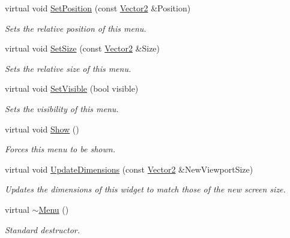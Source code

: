 \begin{DoxyCompactItemize}
virtual void \hyperlink{classphys_1_1UI_1_1Menu_a53ff13bb9b850fb8196c1c0c637afbd5}{SetPosition} (const \hyperlink{classphys_1_1Vector2}{Vector2} \&Position)
\begin{DoxyCompactList}\small\item\em Sets the relative position of this menu. \item\end{DoxyCompactList}\item 
virtual void \hyperlink{classphys_1_1UI_1_1Menu_adef3f9d3351c959f711e929a5e1c8f76}{SetSize} (const \hyperlink{classphys_1_1Vector2}{Vector2} \&Size)
\begin{DoxyCompactList}\small\item\em Sets the relative size of this menu. \item\end{DoxyCompactList}\item 
virtual void \hyperlink{classphys_1_1UI_1_1Menu_a4847e0de055a9c2f708f98742fa59a87}{SetVisible} (bool visible)
\begin{DoxyCompactList}\small\item\em Sets the visibility of this menu. \item\end{DoxyCompactList}\item 
\hypertarget{classphys_1_1UI_1_1Menu_aeb6373cc1be7da0bf5966129f271c861}{
virtual void \hyperlink{classphys_1_1UI_1_1Menu_aeb6373cc1be7da0bf5966129f271c861}{Show} ()}
\label{classphys_1_1UI_1_1Menu_aeb6373cc1be7da0bf5966129f271c861}

\begin{DoxyCompactList}\small\item\em Forces this menu to be shown. \item\end{DoxyCompactList}\item 
virtual void \hyperlink{classphys_1_1UI_1_1Menu_a60a678cc2be8f3eebfe65b3628557928}{UpdateDimensions} (const \hyperlink{classphys_1_1Vector2}{Vector2} \&NewViewportSize)
\begin{DoxyCompactList}\small\item\em Updates the dimensions of this widget to match those of the new screen size. \item\end{DoxyCompactList}\item 
\hypertarget{classphys_1_1UI_1_1Menu_a54b60c45238a3655da9dfa83104adb18}{
virtual \hyperlink{classphys_1_1UI_1_1Menu_a54b60c45238a3655da9dfa83104adb18}{$\sim$Menu} ()}
\label{classphys_1_1UI_1_1Menu_a54b60c45238a3655da9dfa83104adb18}

\begin{DoxyCompactList}\small\item\em Standard destructor. \item\end{DoxyCompactList}\end{DoxyCompactItemize}
